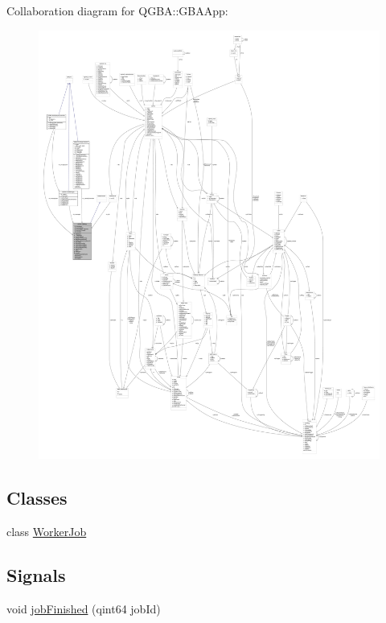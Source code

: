 Collaboration diagram for Q\+G\+BA\+:\+:G\+B\+A\+App\+:
\nopagebreak
\begin{figure}[H]
\begin{center}
\leavevmode
\includegraphics[width=350pt]{class_q_g_b_a_1_1_g_b_a_app__coll__graph}
\end{center}
\end{figure}
\subsection*{Classes}
\begin{DoxyCompactItemize}
\item 
class \mbox{\hyperlink{class_q_g_b_a_1_1_g_b_a_app_1_1_worker_job}{Worker\+Job}}
\end{DoxyCompactItemize}
\subsection*{Signals}
\begin{DoxyCompactItemize}
\item 
void \mbox{\hyperlink{class_q_g_b_a_1_1_g_b_a_app_a7a50fa6391d527db7c25316c77dc165f}{job\+Finished}} (qint64 job\+Id)
\end{DoxyCompactItemize}
